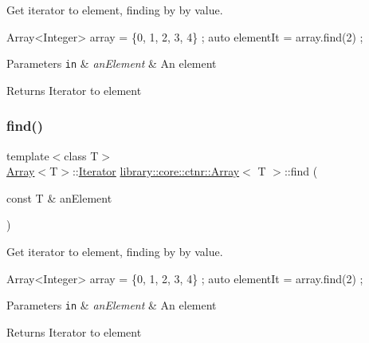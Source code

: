 Get iterator to element, finding by by value. 


\begin{DoxyCode}
Array<Integer> array = \{0, 1, 2, 3, 4\} ;
\textcolor{keyword}{auto} elementIt = array.find(2) ;
\end{DoxyCode}



\begin{DoxyParams}[1]{Parameters}
\mbox{\tt in}  & {\em an\+Element} & An element \\
\hline
\end{DoxyParams}
\begin{DoxyReturn}{Returns}
Iterator to element 
\end{DoxyReturn}
\mbox{\label{classlibrary_1_1core_1_1ctnr_1_1Array_afece85f642e3c623bac197e25ad2d4ec}} 
\subsubsection{\texorpdfstring{find()}{find()}\hspace{0.1cm}{\footnotesize\ttfamily [2/2]}}
{\footnotesize\ttfamily template$<$class T$>$ \\
\hyperlink{classlibrary_1_1core_1_1ctnr_1_1Array}{Array}$<$T$>$\+::\hyperlink{classlibrary_1_1core_1_1ctnr_1_1Array_a2364a34e7bc76d3661c3d89c4729a0e4}{Iterator} \hyperlink{classlibrary_1_1core_1_1ctnr_1_1Array}{library\+::core\+::ctnr\+::\+Array}$<$ T $>$\+::find (\begin{DoxyParamCaption}\item[{const T \&}]{an\+Element }\end{DoxyParamCaption})}



Get iterator to element, finding by by value. 


\begin{DoxyCode}
Array<Integer> array = \{0, 1, 2, 3, 4\} ;
\textcolor{keyword}{auto} elementIt = array.find(2) ;
\end{DoxyCode}



\begin{DoxyParams}[1]{Parameters}
\mbox{\tt in}  & {\em an\+Element} & An element \\
\hline
\end{DoxyParams}
\begin{DoxyReturn}{Returns}
Iterator to element 
\end{DoxyReturn}
\mbox{\label{classlibrary_1_1core_1_1ctnr_1_1Array_aa8a3e2745d72db8181b42e3cfb55415c}} 
